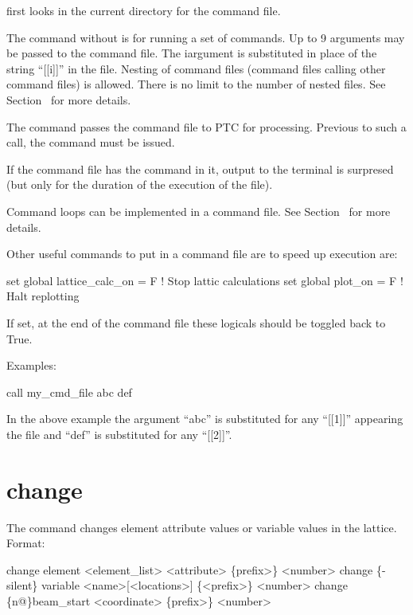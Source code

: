 \vskip 10pt 
\tao first looks in the current directory for the command file.

The  command without  is for running a set of \tao commands.  Up to 9
arguments may be passed to the command file. The i\Th argument is substituted in place of
the string ``[[i]]'' in the file. Nesting of command files (command files calling other
command files) is allowed. There is no limit to the number of nested files.  See
Section~ for more details.

The  command passes the command file to PTC for processing. Previous to such
a call, the command  must be issued.

If the command file has the  command in it, output to the terminal is surpresed (but
only for the duration of the execution of the file).

Command loops can be implemented in a command file. See Section~ for more details.

Other useful commands to put in a command file are to speed up execution are:
\begin{example}
  set global lattice_calc_on = F   ! Stop lattic calculations
  set global plot_on = F           ! Halt replotting
\end{example}
If set, at the end of the command file these logicals should be toggled back to True.

Examples:
\begin{example}
    call my_cmd_file abc def 
\end{example}
In the above example the argument ``abc'' is substituted for any ``[[1]]'' appearing the
file and ``def'' is substituted for any ``[[2]]''.  \Newline

\section{change}
\label{s:change}

The  command changes element attribute values or variable values in the
 lattice. Format:
\begin{example}
  change element <element_list> <attribute> \{prefix>\} <number>
  change \{-silent\} variable <name>[<locations>] \{<prefix>\} <number>
  change  \{n@\}beam_start <coordinate> \{prefix>\} <number>
\end{example}

